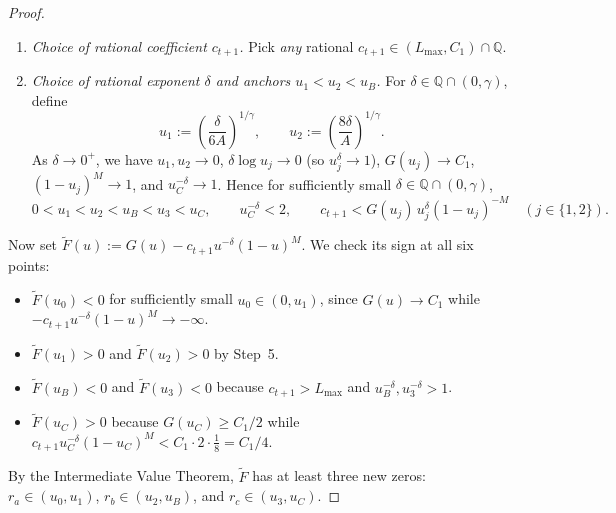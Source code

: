 \documentclass[11pt,a4paper]{amsart}
\theoremstyle{remark}
\newcommand{\Q}{\mathbb{Q}}
\begin{document}
\begin{proof}
\begin{enumerate}
  \item \emph{Choice of rational coefficient $c_{t+1}$.} Pick \emph{any} rational $c_{t+1} \in (L_{\max}, C_1) \cap \Q$.

  \item \emph{Choice of rational exponent $\delta$ and anchors $u_1 < u_2 < u_B$.} For $\delta \in \Q \cap (0, \gamma)$, define
  \[
    u_1 := \left(\frac{\delta}{6 A}\right)^{\!1/\gamma}, \qquad
    u_2 := \left(\frac{8 \delta}{A}\right)^{\!1/\gamma}.
  \]
  As $\delta \to 0^+$, we have $u_1, u_2 \to 0$, $\delta \log u_j \to 0$ (so $u_j^\delta \to 1$), $G(u_j) \to C_1$, $(1 - u_j)^M \to 1$, and $u_C^{-\delta} \to 1$. Hence for sufficiently small $\delta \in \Q \cap (0, \gamma)$,
  \[
    0 < u_1 < u_2 < u_B < u_3 < u_C, \qquad u_C^{-\delta} < 2, \qquad
    c_{t+1} < G(u_j)\, u_j^\delta (1 - u_j)^{-M} \quad (j \in \{1, 2\}).
  \]
\end{enumerate}

Now set $\widetilde{F}(u) := G(u) - c_{t+1} u^{-\delta}(1-u)^M$. We check its sign at all six points:
\begin{itemize}
  \item $\widetilde{F}(u_0) < 0$ for sufficiently small $u_0 \in (0, u_1)$, since $G(u) \to C_1$ while $-c_{t+1} u^{-\delta}(1-u)^M \to -\infty$.
  \item $\widetilde{F}(u_1) > 0$ and $\widetilde{F}(u_2) > 0$ by Step~5.
  \item $\widetilde{F}(u_B) < 0$ and $\widetilde{F}(u_3) < 0$ because $c_{t+1} > L_{\max}$ and $u_B^{-\delta}, u_3^{-\delta} > 1$.
  \item $\widetilde{F}(u_C) > 0$ because $G(u_C) \ge C_1/2$ while $c_{t+1} u_C^{-\delta}(1-u_C)^M < C_1 \cdot 2 \cdot \frac{1}{8} = C_1/4$.
\end{itemize}
By the Intermediate Value Theorem, $\widetilde{F}$ has at least three new zeros: $r_a \in (u_0, u_1)$, $r_b \in (u_2, u_B)$, and $r_c \in (u_3, u_C)$.


\end{proof}
\end{document}
